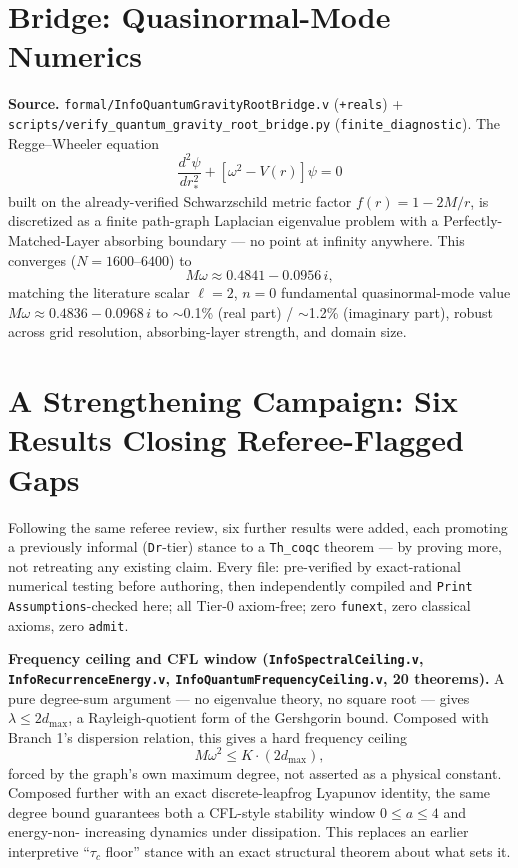 \documentclass[10pt,twocolumn]{article}
\begin{document}
\section{Bridge: Quasinormal-Mode Numerics}
\label{sec:qnm}
\textbf{Source.} \texttt{formal/InfoQuantumGravityRootBridge.v} (\texttt{+reals}) +
\texttt{scripts/verify\_quantum\_gravity\_root\_bridge.py}
(\texttt{finite\_diagnostic}). The Regge--Wheeler equation \cite{regge1957}
\begin{equation}
\frac{d^2\psi}{dr_*^2} + [\omega^2 - V(r)]\psi = 0
\label{eq:rw}
\end{equation}
built on the already-verified Schwarzschild metric factor $f(r)=1-2M/r$, is
discretized as a finite path-graph Laplacian eigenvalue problem with a
Perfectly-Matched-Layer absorbing boundary \cite{berenger1994} --- no point at
infinity anywhere. This converges ($N=1600$--$6400$) to
\begin{equation}
M\omega \approx 0.4841 - 0.0956\,i,
\label{eq:qnmresult}
\end{equation}
matching the literature scalar $\ell=2$, $n=0$ fundamental quasinormal-mode value
$M\omega\approx0.4836-0.0968\,i$ \cite{leaver1985,berti2009} to $\sim$0.1\% (real
part) / $\sim$1.2\% (imaginary part), robust across grid resolution, absorbing-layer
strength, and domain size.

\section{A Strengthening Campaign: Six Results Closing Referee-Flagged Gaps}
\label{sec:campaign}
Following the same referee review, six further results were added, each promoting a
previously informal (\texttt{Dr}-tier) stance to a \texttt{Th\_coqc} theorem --- by
proving more, not retreating any existing claim. Every file: pre-verified by
exact-rational numerical testing before authoring, then independently compiled and
\texttt{Print Assumptions}-checked here; all Tier-0 axiom-free; zero \texttt{funext},
zero classical axioms, zero \texttt{admit}.

\textbf{Frequency ceiling and CFL window (\texttt{InfoSpectralCeiling.v},
\texttt{InfoRecurrenceEnergy.v}, \texttt{InfoQuantumFrequencyCeiling.v}, 20 theorems).}
A pure degree-sum argument --- no eigenvalue theory, no square root --- gives
$\lambda \le 2 d_{\max}$, a Rayleigh-quotient form of the Gershgorin bound. Composed
with Branch 1's dispersion relation, this gives a hard frequency ceiling
\begin{equation}
M\omega^2 \le K \cdot (2 d_{\max}),
\label{eq:freqceiling}
\end{equation}
forced by the graph's own maximum degree, not asserted as a physical constant.
Composed further with an exact discrete-leapfrog Lyapunov identity, the same degree
bound guarantees both a CFL-style stability window $0\le a\le4$ and energy-non-
increasing dynamics under dissipation. This replaces an earlier interpretive
``$\tau_c$ floor'' stance with an exact structural theorem about what sets it.
\end{document}
